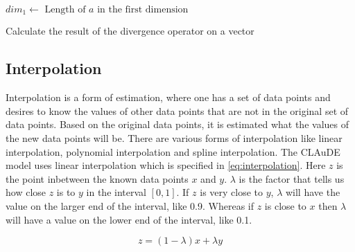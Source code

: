 \begin{algorithm}[!hbt]
    $dim_1 \leftarrow \text{ Length of } a \text{ in the first dimension}$ \;
     \;
    \caption{Calculate the result of the divergence operator on a vector}
    \label{alg:divergence}
\end{algorithm}

\subsection{Interpolation} \label{sec:interpolation}
Interpolation is a form of estimation, where one has a set of data points and desires to know the values of other data points that are not in the original set of data points\cite{interpolation}. 
Based on the original data points, it is estimated what the values of the new data points will be. There are various forms of interpolation like linear interpolation, polynomial interpolation 
and spline interpolation. The CLAuDE model uses linear interpolation which is specified in \autoref{eq:interpolation}. Here $z$ is the point inbetween the known data points $x$ and $y$. 
$\lambda$ is the factor that tells us how close $z$ is to $y$ in the interval $[0, 1]$. If $z$ is very close to $y$, $\lambda$ will have the value on the larger end of the interval, like 0.9.
Whereas if $z$ is close to $x$ then $\lambda$ will have a value on the lower end of the interval, like 0.1.

\begin{equation}
    z = (1 - \lambda)x + \lambda y
    \label{eq:interpolation}
\end{equation}